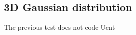 \documentclass[twocolumn,preprintnumbers,superscriptaddress]{revtex4-2}
\begin{document}
\subsection{3D Gaussian distribution}

The previous test does not code Uent



\end{document}
